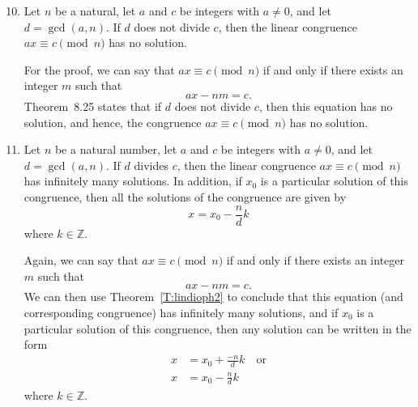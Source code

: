 \begin{enumerate}
\begin{enumerate} \setcounter{enumii}{9}
\item Let $n$ be a natural, let $a$ and $c$ be integers with $a \ne 0$, and let 
$d = \gcd \left( {a, n} \right)$.  If  $d$ does  not divide $c$, then the linear congruence 
$ax \equiv c \pmod n$ has no solution.

\eighth
For the proof, we can say that $ax \equiv c \pmod n$ if and only if there exists an integer $m$ such that
\[
ax - nm = c.
\]
Theorem~8.25 states that if $d$ does not divide $c$, then this equation has no solution, and hence, the congruence $ax \equiv c \pmod n$ has no solution.

\item Let $n$ be a natural number, let $a$ and $c$ be integers with $a \ne 0$, and let 
$d = \gcd \left( {a, n} \right)$.  If  $d$ divides $c$, then the linear congruence 
$ax \equiv c \pmod n$ has infinitely many solutions.  In addition, if $x_0$ is a particular solution of this congruence, then all the solutions of the congruence are given by
\[
x = x_0 - \frac{n}{d} k
\]
where $k \in \mathbb{Z}$.

\eighth
Again, we can say that $ax \equiv c \pmod n$ if and only if there exists an integer $m$ such that
\[
ax - nm = c.
\]
We can then use Theorem~\ref{T:lindioph2} to conclude that this equation (and corresponding congruence) has infinitely many solutions, and if $x_0$ is a particular solution of this congruence, then any solution can be written in the form 
\begin{align*}
x &= x_0 + \frac{-n}{d} k \quad \text{or} \\
x &= x_0 - \frac{n}{d} k
\end{align*}
where $k \in \mathbb{Z}$.



\end{enumerate}

\end{enumerate}

\hbreak

\endinput
